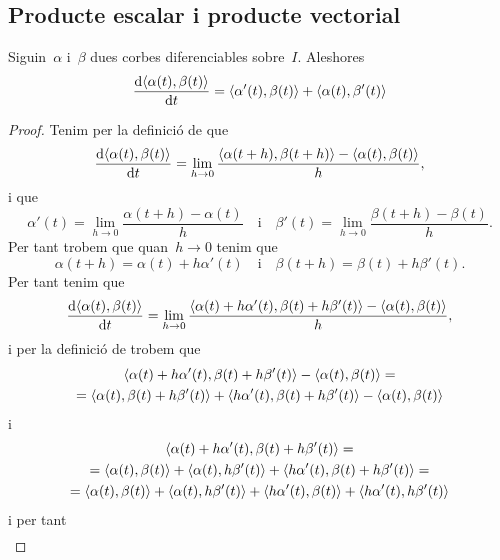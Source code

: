 \documentclass[../../main.tex]{subfiles}
\begin{document}
    \subsection{Producte escalar i producte vectorial}
    \begin{proposition}
        \label{prop:derivada del producte escalar de dues corbes}
        Siguin~\(\alpha\) i~\(\beta\) dues corbes diferenciables sobre~\(I\).
        Aleshores
        \[
            \frac{\diff\prodesc{\alpha(t)}{\beta(t)}}{\diff t}=\prodesc{\alpha'(t)}{\beta(t)}+\prodesc{\alpha(t)}{\beta'(t)}
        \]
        \begin{proof}
            Tenim per la definició de  que
            \[
                \frac{\diff\prodesc{\alpha(t)}{\beta(t)}}{\diff t}=\lim_{h\to0}\frac{\prodesc{\alpha(t+h)}{\beta(t+h)}-\prodesc{\alpha(t)}{\beta(t)}}{h},
            \]
            i que
            \[
                \alpha'(t)=\lim_{h\to0}\frac{\alpha(t+h)-\alpha(t)}{h}\quad\text{i}\quad\beta'(t)=\lim_{h\to0}\frac{\beta(t+h)-\beta(t)}{h}.
            \]
            Per tant trobem que quan~\(h\to0\) tenim que
            \[
                \alpha(t+h)=\alpha(t)+h\alpha'(t)\quad\text{i}\quad\beta(t+h)=\beta(t)+h\beta'(t).
            \]
            Per tant tenim que
            \[
                \frac{\diff\prodesc{\alpha(t)}{\beta(t)}}{\diff t}=\lim_{h\to0}\frac{\prodesc{\alpha(t)+h\alpha'(t)}{\beta(t)+h\beta'(t)}-\prodesc{\alpha(t)}{\beta(t)}}{h},
            \]
            i per la definició de  trobem que
            \begin{multline*}
                \prodesc{\alpha(t)+h\alpha'(t)}{\beta(t)+h\beta'(t)}-\prodesc{\alpha(t)}{\beta(t)}=\\
                =\prodesc{\alpha(t)}{\beta(t)+h\beta'(t)}+\prodesc{h\alpha'(t)}{\beta(t)+h\beta'(t)}-\prodesc{\alpha(t)}{\beta(t)}
            \end{multline*}
            i
            \begin{multline*}
                \prodesc{\alpha(t)+h\alpha'(t)}{\beta(t)+h\beta'(t)}=\\
                =\prodesc{\alpha(t)}{\beta(t)}+\prodesc{\alpha(t)}{h\beta'(t)}+\prodesc{h\alpha'(t)}{\beta(t)+h\beta'(t)}=\\
                =\prodesc{\alpha(t)}{\beta(t)}+\prodesc{\alpha(t)}{h\beta'(t)}+\prodesc{h\alpha'(t)}{\beta(t)}+\prodesc{h\alpha'(t)}{h\beta'(t)}
            \end{multline*}
            i per tant
            \begin{multline*}

\end{multline*}
\end{proof}
\end{proposition}
\end{document}

